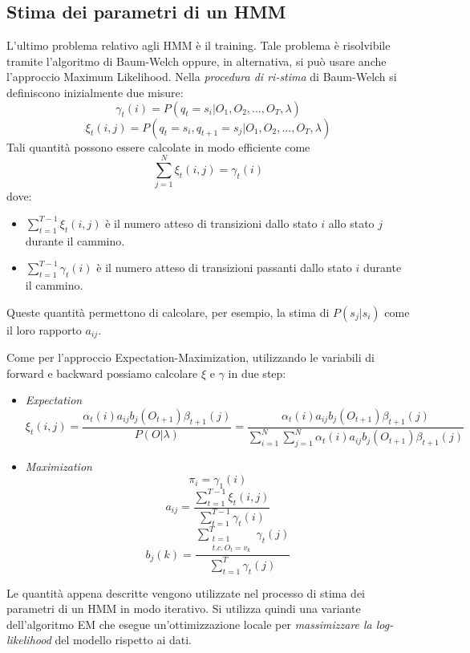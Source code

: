 \documentclass[a4paper,oneside,titlepage]{book}
\begin{document}
\subsection{Stima dei parametri di un HMM}
L'ultimo problema relativo agli HMM è il training. Tale problema è risolvibile tramite l'algoritmo di Baum-Welch oppure, in alternativa, si può usare anche l'approccio Maximum Likelihood. Nella \textit{procedura di ri-stima} di Baum-Welch si definiscono inizialmente due misure:
\[ \gamma_t(i) = P(q_t=s_i|O_1,O_2,...,O_T,\lambda) \]
\[ \xi_t(i,j) = P(q_t=s_i,q_{t+1}=s_j|O_1,O_2,...,O_T,\lambda) \]
Tali quantità possono essere calcolate in modo efficiente come
\[ \sum_{j=1}^N \xi_t(i,j) = \gamma_t(i) \]
dove:
\begin{itemize}
    \item $\sum_{t=1}^{T-1} \xi_t(i,j)$ è il numero atteso di transizioni dallo stato $i$ allo stato $j$ durante il cammino.
    \item $\sum_{t=1}^{T-1} \gamma_t(i)$ è il numero atteso di transizioni passanti dallo stato $i$ durante il cammino.
\end{itemize}
Queste quantità permettono di calcolare, per esempio, la stima di $P(s_j|s_i)$ come il loro rapporto $a_{ij}$.

Come per l'approccio Expectation-Maximization, utilizzando le variabili di forward e backward possiamo calcolare $\xi$ e $\gamma$ in due step:
\begin{itemize}
    \item \textit{Expectation}
    \[ \xi_t(i,j) = \frac{\alpha_t(i) a_{ij} b_j(O_{t+1}) \beta_{t+1}(j)}{P(O|\lambda)} = \frac{\alpha_t(i) a_{ij} b_j(O_{t+1}) \beta_{t+1}(j)}{\sum\limits_{i=1}^N \sum\limits_{j=1}^N \alpha_t(i) a_{ij} b_j(O_{t+1}) \beta_{t+1}(j)} \]

    \item \textit{Maximization}
    \[ \pi_i = \gamma_1(i) \]
    \[ a_{ij} = \frac{\sum\limits_{t=1}^{T-1} \xi_t(i,j)}{\sum\limits_{t=1}^{T-1} \gamma_t(i)} \]
    \[ b_j(k) = \frac{\sum\limits_{\substack{t=1 \\ t.c. \, O_t = v_k}}^{T} \gamma_t(j)}{\sum\limits_{t=1}^{T} \gamma_t(j)} \]
\end{itemize}
Le quantità appena descritte vengono utilizzate nel processo di stima dei parametri di un HMM in modo iterativo. Si utilizza quindi una variante dell'algoritmo EM che esegue un'ottimizzazione locale per \textit{massimizzare la log-likelihood} del modello rispetto ai dati.
\end{document}
